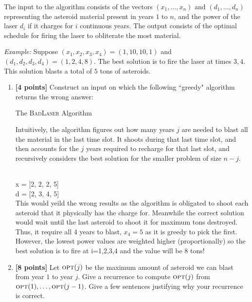\documentclass[11pt]{article}
\theoremstyle{definition}
\theoremstyle{theorem}
\newcommand{\solution}{\medskip\noindent{\color{DarkBlue}\textbf{Solution:}}}
\begin{document}
The input to the algorithm consists of the vectors $(x_1,\ldots,x_n)$ and $(d_1,\ldots,d_n)$ representing the asteroid material present in years $1$ to $n$, and the power of the laser $d_i$ if it charges for $i$ continuous years.  The output consists of the optimal schedule for firing the laser to obliterate the most material.

\medskip
\emph{Example:} Suppose $(x_1,x_2,x_3,x_4)=(1,10,10,1)$ and $(d_1,d_2,d_3,d_4) = (1,2,4,8)$.  
The best solution is to fire the laser at times $3,4$.  This solution blasts a total of $5$ tons of asteroids.

\begin{enumerate}[label=(\alph*)]

\item   \textbf{[4 points]} Construct an input on which  the following ``greedy" algorithm returns the wrong answer:

\begin{algorithm}[h!]
\caption{The \textsc{BadLaser} Algorithm}
\end{algorithm}
Intuitively, the algorithm figures out how many years $j$ are needed to blast all the material in the last time slot.  It shoots during that last time slot, and then accounts for the $j$ years required to recharge for that last slot, and recursively considers the best solution for the smaller problem of size $n-j$.

\solution \\

x = [2, 2, 2, 5] \\
d = [2, 3, 4, 5] \\
This would yeild the wrong results as the algorithm is obligated to shoot each asteroid that it physically has the charge for. 
Meanwhile the correct solution would wait until the last asteroid to shoot it for maximum tons destroyed.\\
Thus, it require all 4 years to blast, $x_4 = 5$ as it is greedy to pick the first. However, the lowest power values are weighted higher (proportionally) so the best solution is to fire at i=1,2,3,4 and the value will be 8 tons!

\item  \textbf{[8 points]} Let $\textsc{opt}(j)$ be the maximum amount of asteroid we can blast from year $1$ to year $j$. Give a recurrence to compute $\textsc{opt}(j)$ from $\textsc{opt}(1), \ldots, \textsc{opt}(j-1)$.  Give a few sentences justifying why your recurrence is correct.


\end{enumerate}
\end{document}
